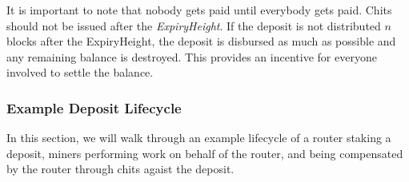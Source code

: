 \documentclass[letterpaper,11pt]{article}
\begin{document}
It is important to note that nobody gets paid until everybody gets paid. Chits should not be issued after the \emph{ExpiryHeight}. If the deposit is not distributed $n$ blocks after the ExpiryHeight, the deposit is disbursed as much as possible and any remaining balance is destroyed. This provides an incentive for everyone involved to settle the balance.

\subsubsection{Example Deposit Lifecycle}

In this section, we will walk through an example lifecycle of a router staking a deposit, miners performing work on behalf of the router, and being compensated by the router through chits agaist the deposit.
\end{document}

